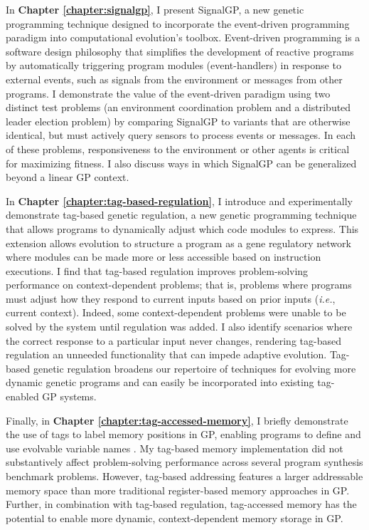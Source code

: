 In \textbf{Chapter \ref{chapter:signalgp}}, I present SignalGP, a new genetic programming technique designed to incorporate the event-driven programming paradigm into computational evolution's toolbox. 
Event-driven programming is a software design philosophy that simplifies the development of reactive programs by automatically triggering program modules (event-handlers) in response to external events, such as signals from the environment or messages from other programs. 
I demonstrate the value of the event-driven paradigm using two distinct test problems (an environment coordination problem and a distributed leader election problem) by comparing SignalGP to variants that are otherwise identical, but must actively query sensors to process events or messages. 
In each of these problems, responsiveness to the environment or other agents is critical for maximizing fitness. 
I also discuss ways in which SignalGP can be generalized beyond a linear GP context.

In \textbf{Chapter \ref{chapter:tag-based-regulation}}, I introduce and experimentally demonstrate tag-based genetic regulation, a new genetic programming technique that allows programs to dynamically adjust which code modules to express.
This extension allows evolution to structure a program as a gene regulatory network where modules can be made more or less accessible based on instruction executions.
I find that tag-based regulation improves problem-solving performance on context-dependent problems; that is, problems where programs must adjust how they respond to current inputs based on prior inputs (\textit{i.e.}, current context).
Indeed, some context-dependent problems were unable to be solved by the system until regulation was added.
I also identify scenarios where the correct response to a particular input never changes, rendering tag-based regulation an unneeded functionality that can impede adaptive evolution.
Tag-based genetic regulation broadens our repertoire of techniques for evolving more dynamic genetic programs and can easily be incorporated into existing tag-enabled GP systems.

Finally, in \textbf{Chapter \ref{chapter:tag-accessed-memory}}, I briefly demonstrate the use of tags to label memory positions in GP, enabling programs to define and use evolvable variable names \citep{lalejini_tag-accessed_2019}.
My tag-based memory implementation did not substantively affect problem-solving performance across several program synthesis benchmark problems.
However, tag-based addressing features a larger addressable memory space than more traditional register-based memory approaches in GP.
Further, in combination with tag-based regulation, tag-accessed memory has the potential to enable more dynamic, context-dependent memory storage in GP.